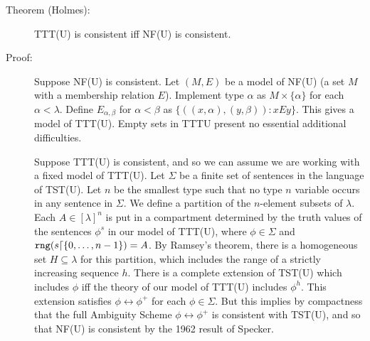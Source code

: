 \documentclass[112pt]{article}
\begin{document}
\begin{description}

\item[Theorem (Holmes):]  TTT(U) is consistent iff NF(U) is consistent.

\item[Proof:]  Suppose NF(U) is consistent.  Let $(M,E)$ be a model of NF(U) (a set $M$ with a membership relation $E$).  Implement type $\alpha$ as $M \times \{\alpha\}$ for
each $\alpha<\lambda$.  Define $E_{\alpha,\beta}$ for $\alpha<\beta$ as $\{((x,\alpha),(y,\beta)):xEy\}$.  This gives a model of TTT(U).   Empty sets in TTTU present no essential additional difficulties.

Suppose TTT(U) is consistent, and so we can assume we are working with a fixed model of TTT(U).  Let $\Sigma$ be a finite set of sentences in the language of TST(U).  Let $n$ be the smallest type such that no type $n$ variable occurs in any sentence in $\Sigma$.  We define a partition of the $n$-element subsets of $\lambda$.  Each $A \in [\lambda]^n$ is put in a compartment
determined by the truth values of the sentences $\phi^s$ in our model of TTT(U), where $\phi \in \Sigma$ and ${\tt rng}(s \lceil \{0,\ldots,n-1\}) = A$.  By Ramsey's theorem, there is a homogeneous set $H \subseteq \lambda$ for this partition, which includes the range of a strictly increasing sequence $h$.  There is a complete extension of TST(U) which includes
$\phi$ iff the theory of our model of TTT(U) includes $\phi^h$.  This extension satisfies $\phi \leftrightarrow \phi^+$ for each $\phi \in \Sigma$.  But this implies by compactness that the full Ambiguity Scheme $\phi \leftrightarrow \phi^+$ is consistent with TST(U), and so that NF(U) is consistent by the 1962 result of Specker.


\end{description}
\end{document}
